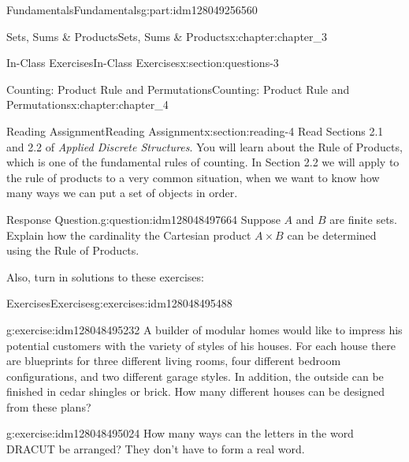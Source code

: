 \documentclass[oneside,10pt,]{book}
\numberwithin{equation}{section}
\begin{document}
\begin{partptx}{Fundamentals}{}{Fundamentals}{}{}{g:part:idm128049256560}
\begin{chapterptx}{Sets, Sums \& Products}{}{Sets, Sums \& Products}{}{}{x:chapter:chapter_3}
\begin{sectionptx}{In-Class Exercises}{}{In-Class Exercises}{}{}{x:section:questions-3}
\begin{enumerate}[label=\arabic*.]
\end{enumerate}
%
\end{sectionptx}
\end{chapterptx}
%
\typeout{************************************************}
\typeout{************************************************}
%
\begin{chapterptx}{Counting: Product Rule and Permutations}{}{Counting: Product Rule and Permutations}{}{}{x:chapter:chapter_4}
\index{}%
%
%
\typeout{************************************************}
\typeout{************************************************}
%
\begin{sectionptx}{Reading Assignment}{}{Reading Assignment}{}{}{x:section:reading-4}
Read Sections 2.1 and 2.2 of \emph{Applied Discrete Structures}.  You will learn about the Rule of Products, which is one of the fundamental rules of counting.  In Section 2.2 we will apply to the rule of products to a very common situation, when we want to know how many ways we can put a set of objects in order.%
\begin{question}{Response Question.}{g:question:idm128048497664}%
Suppose \(A\) and \(B\) are finite sets.  Explain how the cardinality the Cartesian product \(A \times B\) can be determined using the Rule of Products.%
\end{question}
Also, turn in solutions to these exercises:%
%
%
\typeout{************************************************}
\typeout{************************************************}
%
\begin{exercises-subsection}{Exercises}{}{Exercises}{}{}{g:exercises:idm128048495488}
\par\medskip\noindent%
%
\begin{exercisegroup}
\begin{divisionexerciseeg}{1}{}{}{g:exercise:idm128048495232}%
A builder of modular homes would like to impress his potential customers with the variety of styles of his houses. For each house there are blueprints for three different living rooms, four different bedroom configurations, and two different garage styles. In addition, the outside can be finished in cedar shingles or brick. How many different houses can be designed from these plans?%
\end{divisionexerciseeg}%
\begin{divisionexerciseeg}{2}{}{}{g:exercise:idm128048495024}%
How many ways can the letters in the word DRACUT be arranged? They don't have to form a real word.%

\end{divisionexerciseeg}
\end{exercisegroup}
\end{exercises-subsection}
\end{sectionptx}
\end{chapterptx}
\end{partptx}
\end{document}

